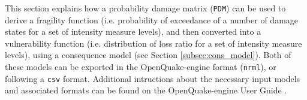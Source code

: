 This section explains how a probability damage matrix (\verb=PDM=) can be used to derive a fragility function (i.e. probability of exceedance of a number of
damage states for a set of intensity measure levels), and then converted into a vulnerability function  (i.e. distribution of loss ratio for a set of intensity measure levels), using a consequence model (see Section \ref{subsec:cons_model}). Both of these models can be exported in the OpenQuake-engine format (\verb=nrml=), or following a \verb=csv= format. Additional intructions about the necessary input models and associated formats can be found on the OpenQuake-engine User Guide \citep{GEM2015}.\\
